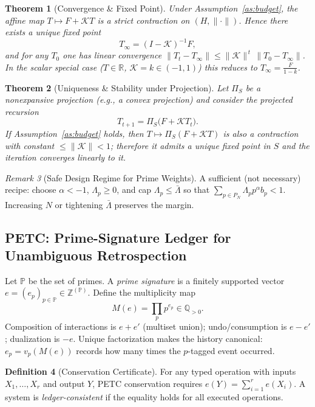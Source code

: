 \documentclass[11pt]{article}
\theoremstyle{plain}
\newtheorem{theorem}{Theorem}
\theoremstyle{definition}
\newtheorem{definition}[theorem]{Definition}
\theoremstyle{remark}
\newtheorem{remark}[theorem]{Remark}
\begin{document}
\begin{theorem}[Convergence \& Fixed Point]
\label{thm:convergence}
Under Assumption~\ref{as:budget}, the affine map $T\mapsto F+\mathcal{K}T$ is a strict contraction on $(H,\|\cdot\|)$. Hence there exists a unique fixed point
\[
T_\infty=(I-\mathcal{K})^{-1}F,
\]
and for any $T_0$ one has linear convergence
$\|T_t-T_\infty\|\le \|\mathcal{K}\|^{\,t}\,\|T_0-T_\infty\|$.
In the scalar special case ($T\in\mathbb{R}$, $\mathcal{K}=k\in(-1,1)$) this reduces to $T_\infty=\frac{F}{1-k}$.
\end{theorem}

\begin{theorem}[Uniqueness \& Stability under Projection]
\label{thm:uniqueness}
Let $\Pi_S$ be a nonexpansive projection (e.g., a convex projection) and consider the projected recursion
\[
T_{t+1}=\Pi_S\!\big(F+\mathcal{K}T_t\big).
\]
If Assumption~\ref{as:budget} holds, then $T\mapsto \Pi_S(F+\mathcal{K}T)$ is also a contraction with constant $\le\|\mathcal{K}\|<1$; therefore it admits a unique fixed point in $S$ and the iteration converges linearly to it.
\end{theorem}

\begin{remark}[Safe Design Regime for Prime Weights]
A sufficient (not necessary) recipe: choose $\alpha< -1$, $\Lambda_p\ge0$, and cap $\Lambda_p\le\bar\Lambda$ so that $\sum_{p\in P_N}\Lambda_p p^{\alpha} b_p<1$. Increasing $N$ or tightening $\bar\Lambda$ preserves the margin.
\end{remark}

\subsection{PETC: Prime-Signature Ledger for Unambiguous Retrospection}
Let $\mathbb{P}$ be the set of primes. A \emph{prime signature} is a finitely supported vector $e=(e_p)_{p\in\mathbb{P}}\in\mathbb{Z}^{(\mathbb{P})}$. Define the multiplicity map
\[
M(e)=\prod_{p} p^{e_p}\in\mathbb{Q}_{>0}.
\]
Composition of interactions is $e+e'$ (multiset union); undo/consumption is $e-e'$; dualization is $-e$.
Unique factorization makes the history canonical: $e_p=v_p(M(e))$ records how many times the $p$-tagged event occurred.

\begin{definition}[Conservation Certificate]
For any typed operation with inputs $X_1,\dots,X_r$ and output $Y$, PETC conservation requires
\(
e(Y)=\sum_{i=1}^r e(X_i).
\)
A system is \emph{ledger-consistent} if the equality holds for all executed operations.
\end{definition}
\end{document}
